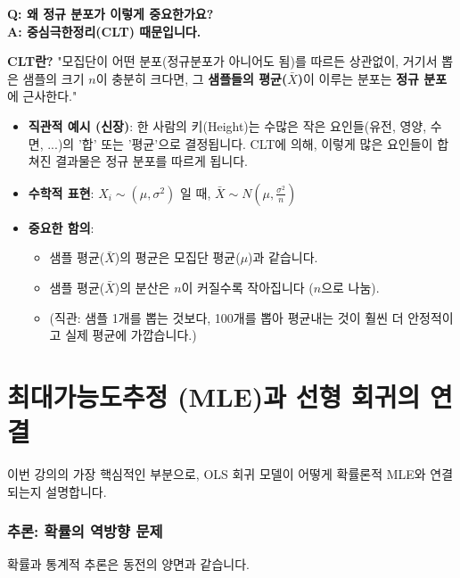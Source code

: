 \documentclass[11pt,a4paper]{book}
\theoremstyle{definition}
\begin{document}
\begin{tcolorbox}[colback=yellow!5!white, colframe=yellow!75!black, title={핵심 원리: 중심극한정리 (Central Limit Theorem, CLT)}]
\textbf{Q: 왜 정규 분포가 이렇게 중요한가요?}\\
\textbf{A: 중심극한정리(CLT) 때문입니다.}

\textbf{CLT란?} "모집단이 어떤 분포(정규분포가 아니어도 됨)를 따르든 상관없이, 거기서 뽑은 샘플의 크기 $n$이 충분히 크다면, 그 \textbf{샘플들의 평균($\bar{X}$)}이 이루는 분포는 \textbf{정규 분포}에 근사한다."

\begin{itemize}
    \item \textbf{직관적 예시 (신장)}: 한 사람의 키(Height)는 수많은 작은 요인들(유전, 영양, 수면, ...)의 '합' 또는 '평균'으로 결정됩니다. CLT에 의해, 이렇게 많은 요인들이 합쳐진 결과물은 정규 분포를 따르게 됩니다.
    \item \textbf{수학적 표현}: $X_i \sim (\mu, \sigma^2)$ 일 때, $\bar{X} \sim N(\mu, \frac{\sigma^2}{n})$
    \item \textbf{중요한 함의}:
        \begin{itemize}
            \item 샘플 평균($\bar{X}$)의 평균은 모집단 평균($\mu$)과 같습니다.
            \item 샘플 평균($\bar{X}$)의 분산은 $n$이 커질수록 작아집니다 ($n$으로 나눔).
            \item (직관: 샘플 1개를 뽑는 것보다, 100개를 뽑아 평균내는 것이 훨씬 더 안정적이고 실제 평균에 가깝습니다.)
        \end{itemize}
\end{itemize}
\end{tcolorbox}


\part{최대가능도추정 (MLE)과 선형 회귀의 연결}
\label{part:mle}

이번 강의의 가장 핵심적인 부분으로, OLS 회귀 모델이 어떻게 확률론적 MLE와 연결되는지 설명합니다.

\section{추론: 확률의 역방향 문제}

확률과 통계적 추론은 동전의 양면과 같습니다.
\end{document}
